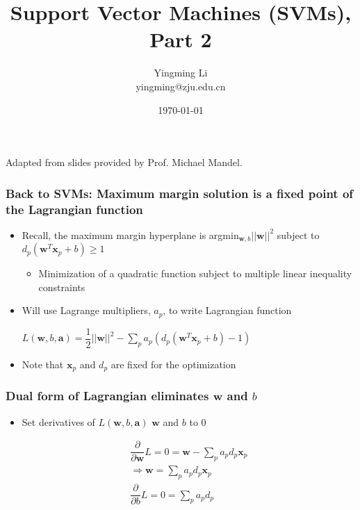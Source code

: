 \documentclass[12pt,notes,mathserif]{beamer}
\title{Support Vector Machines (SVMs), Part 2}
\author[YingmingLi]{Yingming Li \\ yingming@zju.edu.cn}
\institute[DSERC, ZJU]{Data Science \& Engineering Research Center, ZJU}
\date[\today]{\today}
\begin{document}

\begin{frame}[c]
	\titlepage
	\begin{center}
		Adapted from slides provided by Prof. Michael Mandel.
	\end{center}
\end{frame}

\begin{frame}[c]
\frametitle{Back to SVMs: Maximum margin solution is a fixed point of the Lagrangian function}
\begin{itemize}
\item Recall, the maximum margin hyperplane is argmin$_{\mathbf{w},b}||\mathbf{w}||^2$ subject to $d_p(\mathbf{w}^T\mathbf{x}_p+b)\geqslant{}1$
\begin{itemize}
\item Minimization of a quadratic function subject to multiple linear inequality constraints
\end{itemize}
\item Will use Lagrange multipliers, $a_p$, to write Lagrangian function

$L(\mathbf{w},b,\mathbf{a})=\dfrac{1}{2}||\mathbf{w}||^2-\sum\limits_pa_p(d_p(\mathbf{w}^T\mathbf{x}_p+b)-1)$
\item Note that $\mathbf{x}_p$ and $d_p$ are fixed for the optimization
\end{itemize}

\end{frame}


\begin{frame}[c]
\frametitle{Dual form of Lagrangian eliminates $\mathbf{w}$ and $b$}
\begin{itemize}
\item Set derivatives of $L(\mathbf{w},b,\mathbf{a})$ \wrt $\mathbf{w}$ and $b$ to 0

\begin{align*}
\dfrac{\partial}{\partial \mathbf{w}}L=0=\mathbf{w}-\sum_pa_pd_p\mathbf{x}_p\\
\Rightarrow \mathbf{w}=\sum_pa_pd_p\mathbf{x}_p\\
\dfrac{\partial}{\partial b}L=0=\sum_pa_pd_p
\end{align*}

\end{itemize}
\end{frame}
\end{document}
